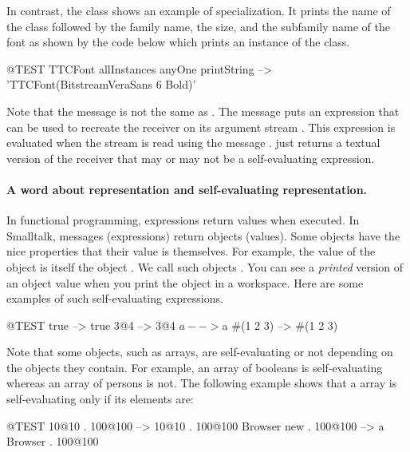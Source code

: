 \documentclass[a4paper,10pt,twoside]{book}
\begin{document}
In contrast, the class  shows an example of  specialization.
It prints the name of the class followed by the family name, the size, and the subfamily name of the font as shown by the code below which prints an instance of the class.


\begin{code}{@TEST}
TTCFont allInstances anyOne printString --> 'TTCFont(BitstreamVeraSans 6 Bold)'
\end{code}

Note that the message  is not the same as .
The message  puts an expression that can be used to recreate the receiver on its argument stream .
This expression is evaluated when the stream is read using the message .
 just returns a textual version of the receiver that may or may not be a self-evaluating expression.

\paragraph{A word about representation and self-evaluating representation.}
In functional programming, expressions return values when executed.
In Smalltalk, messages (expressions) return objects (values).
Some objects have the nice properties that their value is themselves.
For example, the value of the object  is itself \ie the object .
We call such objects .
You can see a \emph{printed} version of an object value when you print the object in a workspace.
Here are some examples of such self-evaluating expressions. 

\begin{code}{@TEST}
true       --> true
3@4     --> 3@4
$a         --> $a
#(1 2 3) --> #(1 2 3)
\end{code}

Note that some objects, such as arrays, are self-evaluating or not depending on the objects they contain.
For example, an array of booleans is self-evaluating whereas an array of persons is not.
The following example shows that a  array is self-evaluating only if its elements are:
\begin{code}{@TEST}
{10@10 . 100@100}          --> {10@10 . 100@100}
{Browser new . 100@100} --> {a Browser . 100@100}
\end{code}
\end{document}
